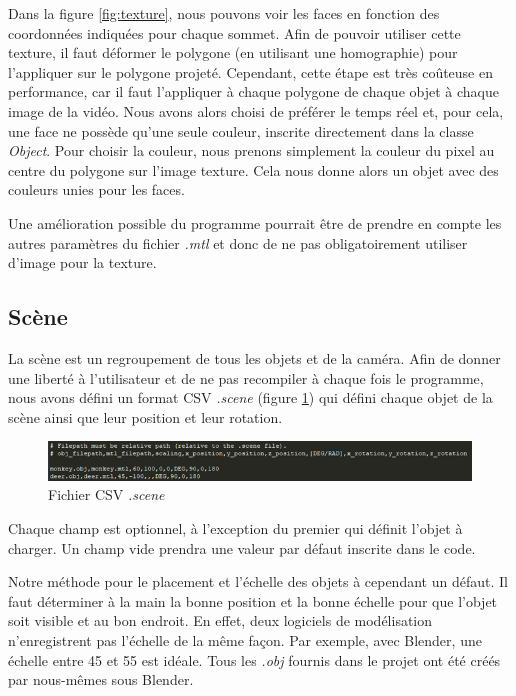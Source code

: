             Dans la figure \ref{fig:texture}, nous pouvons voir les faces en fonction des coordonnées indiquées pour chaque sommet. Afin de pouvoir utiliser cette texture, il faut déformer le polygone (en utilisant une homographie) pour l'appliquer sur le polygone projeté. Cependant, cette étape est très coûteuse en performance, car il faut l'appliquer à chaque polygone de chaque objet à chaque image de la vidéo. Nous avons alors choisi de préférer le temps réel et, pour cela, une face ne possède qu'une seule couleur, inscrite directement dans la classe \emph{Object}. Pour choisir la couleur, nous prenons simplement la couleur du pixel au centre du polygone sur l'image texture. Cela nous donne alors un objet avec des couleurs unies pour les faces. 
            
            Une amélioration possible du programme pourrait être de prendre en compte les autres paramètres du fichier \emph{.mtl} et donc de ne pas obligatoirement utiliser d'image pour la texture.

        \subsection{Scène}

            La scène est un regroupement de tous les objets et de la caméra. Afin de donner une liberté à l'utilisateur et de ne pas recompiler à chaque fois le programme, nous avons défini un format CSV \emph{.scene} (figure \ref{fig:scene}) qui défini chaque objet de la scène ainsi que leur position et leur rotation.

            \begin{figure}[h]
                \centering
                \includegraphics[scale=0.8]{img/rendu/scene.png}
                \caption{Fichier CSV \emph{.scene}}
                \label{fig:scene}
            \end{figure}

            Chaque champ est optionnel, à l'exception du premier qui définit l'objet à charger. Un champ vide prendra une valeur par défaut inscrite dans le code.

            Notre méthode pour le placement et l'échelle des objets à cependant un défaut. Il faut déterminer à la main la bonne position et la bonne échelle pour que l'objet soit visible et au bon endroit. En effet, deux logiciels de modélisation n'enregistrent pas l'échelle de la même façon. Par exemple, avec Blender, une échelle entre 45 et 55 est idéale. Tous les \emph{.obj} fournis dans le projet ont été créés par nous-mêmes sous Blender.

